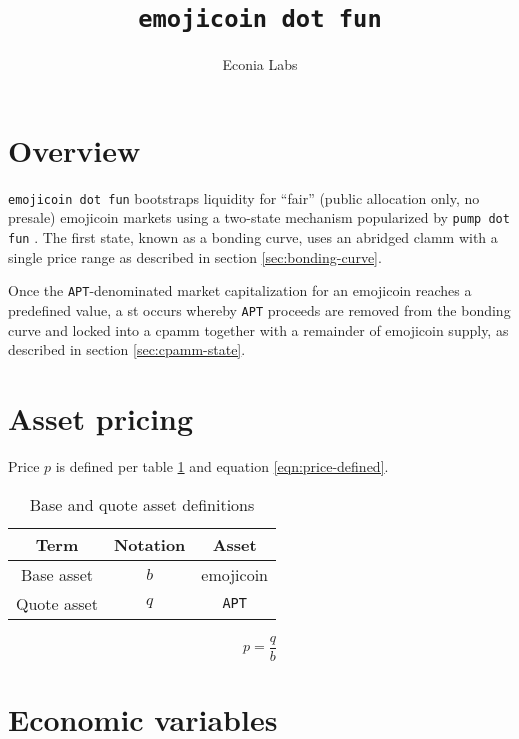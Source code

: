 \documentclass[table, twocolumn]{article}
\title{\texttt{emojicoin dot fun}}
\author{Econia Labs}
\date{}
\begin{document}
\maketitle

\section{Overview} \label{sec:overview}

\texttt{emojicoin dot fun} bootstraps liquidity for ``fair'' (public allocation only, no
presale) emojicoin \cite{emojicoin} markets using a two-state mechanism popularized
by \texttt{pump dot fun} \cite{pump}. The first state, known as a bonding curve, uses an
abridged \gls*{clamm} with a single price range \cite{univ3} as described in section
\ref{sec:bonding-curve}.

Once the \texttt{APT}-denominated \cite{octa} market capitalization for an emojicoin
reaches a predefined value, a \gls*{st} occurs whereby \texttt{APT} proceeds
are removed from the bonding curve and locked into a \gls*{cpamm} \cite{univ2} together
with a remainder of emojicoin supply, as described in section \ref{sec:cpamm-state}.

\section{Asset pricing}

Price $p$ is defined per table \ref{tab:b-q-definitions} and equation
\ref{eqn:price-defined}.

\begin{table}[!htb]
  \centering
  \begin{tabular}{|c|c|c|}
    \hline \rowcolor{blue}
    Term        & Notation & Asset        \\ \hline
    Base asset  & $b$      & emojicoin    \\ \hline
    Quote asset & $q$      & \texttt{APT} \\ \hline
  \end{tabular}
  \caption{Base and quote asset definitions}
  \label{tab:b-q-definitions}
\end{table}

\begin{equation} \label{eqn:price-defined}
  p = \frac{q}{b}
\end{equation}

\section{Economic variables}
\end{document}
